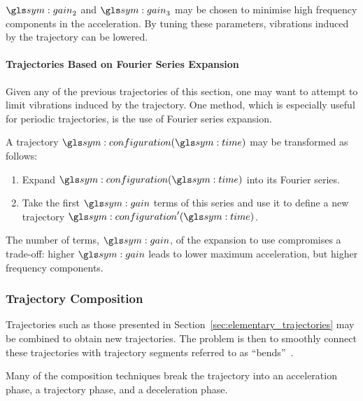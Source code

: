 				$\gain_2$ and $\gain_3$ may be chosen to minimise high frequency
				components in the acceleration. By tuning these parameters,
				vibrations induced by the trajectory can be lowered.

			\paragraph{Trajectories Based on Fourier Series Expansion}%
			\label{trajectories_based_on_fourier_series_expansion}

				Given any of the previous trajectories of this section, one may
				want to attempt to limit vibrations induced by the trajectory.
				One method, which is especially useful for periodic
				trajectories, is the use of Fourier series expansion.

				A trajectory $\configuration(\timesym)$ may be transformed as
				follows:

				\begin{enumerate}

					\item

						Expand $\configuration(\timesym)$ into its Fourier
						series.

					\item

						Take the first $\gain$ terms of this series and use it to
						define a new trajectory $\configuration'(\timesym)$.

				\end{enumerate}

				The number of terms, $\gain$, of the expansion to use
				compromises a trade-off: higher $\gain$ leads to lower maximum
				acceleration, but higher frequency components.

		\subsubsection{Trajectory Composition}%
		\label{sec:trajetory_composition}

			Trajectories such as those presented in
			Section~\ref{sec:elementary_trajectories} may be combined to obtain
			new trajectories. The problem is then to smoothly connect these
			trajectories with trajectory segments referred to as
			``bends''~\cite{bib:traj:trajectory_planning_for_automatic_machines_and_robots}.

			Many of the composition techniques break the trajectory into an
			acceleration phase, a trajectory phase, and a deceleration phase.

